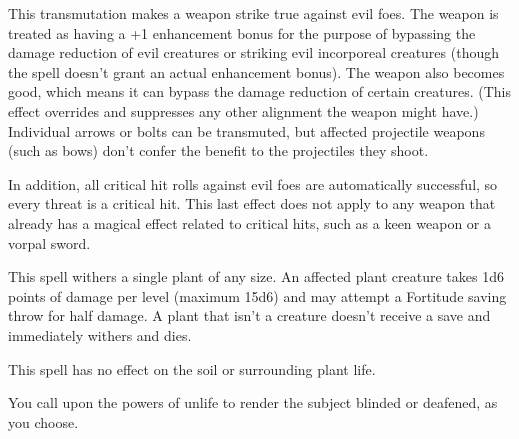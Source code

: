 \begin{multicols}{2}
\begin{small}
\noindent This transmutation makes a weapon strike true against evil foes. The weapon is treated as having a +1 enhancement bonus for the purpose of bypassing the damage reduction of evil creatures or striking evil incorporeal creatures (though the spell doesn't grant an actual enhancement bonus). The weapon also becomes good, which means it can bypass the damage reduction of certain creatures. (This effect overrides and suppresses any other alignment the weapon might have.) Individual arrows or bolts can be transmuted, but affected projectile weapons (such as bows) don't confer the benefit to the projectiles they shoot.

\smallskip\noindent In addition, all critical hit rolls against evil foes are automatically successful, so every threat is a critical hit. This last effect does not apply to any weapon that already has a magical effect related to critical hits, such as a keen weapon or a vorpal sword.

\noindent This spell withers a single plant of any size. An affected plant creature takes 1d6 points of damage per level (maximum 15d6) and may attempt a Fortitude saving throw for half damage. A plant that isn't a creature doesn't receive a save and immediately withers and dies.

\smallskip\noindent This spell has no effect on the soil or surrounding plant life.

\noindent You call upon the powers of unlife to render the subject blinded or deafened, as you choose.


\end{small}
\end{multicols}
